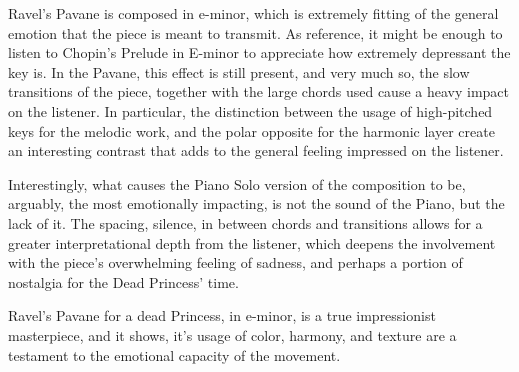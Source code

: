 \documentclass[titlepage,12pt]{article}
\begin{document}
    Ravel's Pavane is composed in e-minor, which is extremely fitting of the general emotion that the piece is meant to transmit. As reference, it might be enough to listen to Chopin's Prelude in E-minor to appreciate how extremely depressant the key is. In the Pavane, this effect is still present, and very much so, the slow transitions of the piece, together with the large chords used cause a heavy impact on the listener. In particular, the distinction between the usage of high-pitched keys for the melodic work, and the polar opposite for the harmonic layer create an interesting contrast that adds to the general feeling impressed on the listener. 
    
    Interestingly, what causes the Piano Solo version of the composition to be, arguably, the most emotionally impacting, is not the sound of the Piano, but the lack of it. The spacing, silence, in between chords and transitions allows for a greater interpretational depth from the listener, which deepens the involvement with the piece's overwhelming feeling of sadness, and perhaps a portion of nostalgia for the Dead Princess' time.

    Ravel's Pavane for a dead Princess, in e-minor, is a true impressionist masterpiece, and it shows, it's usage of color, harmony, and texture are a testament to the emotional capacity of the movement.
    
\end{document}
